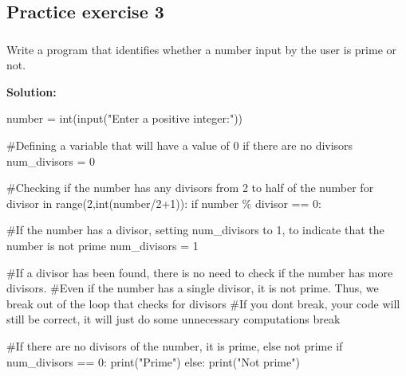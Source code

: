 \documentclass[
  letterpaper,
  DIV=11,
  numbers=noendperiod]{scrreprt}
\newenvironment{Shaded}{\begin{snugshade}}{\end{snugshade}}
\newcommand{\BuiltInTok}[1]{\textcolor[rgb]{0.00,0.23,0.31}{#1}}
\newcommand{\CommentTok}[1]{\textcolor[rgb]{0.37,0.37,0.37}{#1}}
\newcommand{\ControlFlowTok}[1]{\textcolor[rgb]{0.00,0.23,0.31}{#1}}
\newcommand{\DecValTok}[1]{\textcolor[rgb]{0.68,0.00,0.00}{#1}}
\newcommand{\KeywordTok}[1]{\textcolor[rgb]{0.00,0.23,0.31}{#1}}
\newcommand{\NormalTok}[1]{\textcolor[rgb]{0.00,0.23,0.31}{#1}}
\newcommand{\OperatorTok}[1]{\textcolor[rgb]{0.37,0.37,0.37}{#1}}
\newcommand{\StringTok}[1]{\textcolor[rgb]{0.13,0.47,0.30}{#1}}
\begin{document}
\hypertarget{practice-exercise-3-1}{%
\subsection{Practice exercise 3}\label{practice-exercise-3-1}}

\hypertarget{section-2}{%
\subsubsection{}\label{section-2}}

Write a program that identifies whether a number input by the user is
prime or not.

\textbf{Solution:}

\begin{Shaded}
\begin{Highlighting}[]
\NormalTok{number }\OperatorTok{=} \BuiltInTok{int}\NormalTok{(}\BuiltInTok{input}\NormalTok{(}\StringTok{"Enter a positive integer:"}\NormalTok{))}

\CommentTok{\#Defining a variable that will have a value of 0 if there are no divisors}
\NormalTok{num\_divisors }\OperatorTok{=} \DecValTok{0}

\CommentTok{\#Checking if the number has any divisors from 2 to half of the number}
\ControlFlowTok{for}\NormalTok{ divisor }\KeywordTok{in} \BuiltInTok{range}\NormalTok{(}\DecValTok{2}\NormalTok{,}\BuiltInTok{int}\NormalTok{(number}\OperatorTok{/}\DecValTok{2}\OperatorTok{+}\DecValTok{1}\NormalTok{)):}
        \ControlFlowTok{if}\NormalTok{ number }\OperatorTok{\%}\NormalTok{ divisor }\OperatorTok{==} \DecValTok{0}\NormalTok{:}
            
            \CommentTok{\#If the number has a divisor, setting num\_divisors to 1, to indicate that the number is not prime}
\NormalTok{            num\_divisors }\OperatorTok{=} \DecValTok{1}
            
            \CommentTok{\#If a divisor has been found, there is no need to check if the number has more divisors.}
            \CommentTok{\#Even if the number has a single divisor, it is not prime. Thus, we \textquotesingle{}break\textquotesingle{} out of the loop that checks for divisors}
            \CommentTok{\#If you don\textquotesingle{}t \textquotesingle{}break\textquotesingle{}, your code will still be correct, it will just do some unnecessary computations}
            \ControlFlowTok{break}
            
\CommentTok{\#If there are no divisors of the number, it is prime, else not prime      }
\ControlFlowTok{if}\NormalTok{ num\_divisors }\OperatorTok{==} \DecValTok{0}\NormalTok{:}
    \BuiltInTok{print}\NormalTok{(}\StringTok{"Prime"}\NormalTok{)   }
\ControlFlowTok{else}\NormalTok{:}
    \BuiltInTok{print}\NormalTok{(}\StringTok{"Not prime"}\NormalTok{)}
\end{Highlighting}
\end{Shaded}
\end{document}
